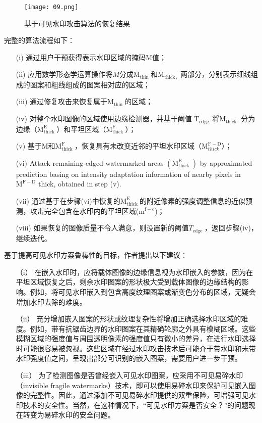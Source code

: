 \begin{figure*}[!htbp]
	\centering
	\texttt{[image: 09.png]}
	\caption{基于可见水印攻击算法的恢复结果}
	\label{fig:09}
\end{figure*}

完整的算法流程如下：

\begin{enumerate}
	\item[(i)] 通过用户干预获得表示水印区域的掩码$\mathrm{M}$值；
	\item[(ii)] 应用数学形态学运算操作将$M$分成$\mathrm{M}_{\text {thin }}$和$\mathrm{M}_{\text {thick，}}$两部分，分别表示细线组成的图案和粗线组成的图案相对应的区域；
	\item[(iii)] 通过修复攻击来恢复属于$\mathrm{M}_{\text {thin }}$的区域；
	\item[(iv)] 对整个水印图像的区域使用边缘检测器，并基于阈值  $\mathrm{T}_{\text {edge. }}$将$\mathrm{M}_{\text {thick }}$  分为边缘（$\mathrm{M}_{\text {thick }}^{\mathrm{E}}$）和平坦区域（$\mathrm{M}_{\text {thick }}^{\mathrm{F}}$）；
	\item[(v)] 基于$\mathrm{M}$和$\mathrm{M}_{\text {thick }}^{\mathrm{F}}$，恢复具有未改变近邻的平坦水印区域（$\mathrm{M}^{\mathrm{F}-\mathrm{D}}_{thick}$）；
	\item[(vi)] Attack remaining edged watermarked areas $\left(\mathrm{M}_{\text {thick }}^{\mathrm{E}}\right)$ by approximated prediction basing on intensity adaptation information of nearby pixels in $\mathrm{M}^{\mathrm{F}-\mathrm{D}}$ thick, obtained in step (v).
	\item[(vii)] 通过基于在步骤(vi)中恢复的$\mathrm{M}_{\text {thick }}^{\mathrm{E}}$的附近像素的强度调整信息的近似预测，攻击完全包含在水印内的平坦区域($\mathrm{m}^{\mathrm{f}-\mathrm{c}}$)；	
	\item[(viii)] 如果恢复的图像质量不令人满意，则设置新的阈值$T_{\text {edge }}$，返回步骤(iv)，继续迭代。

\end{enumerate}

基于提高可见水印方案鲁棒性的目标，作者提出以下建议：
\begin{enumerate}
	\item[（i）] 在嵌入水印时，应将载体图像的边缘信息视为水印嵌入的参数，因为在平坦区域恢复之后，剩余水印图案的形状极大受到载体图像的边缘结构的影响。例如，将可见水印嵌入到包含高度纹理图案或渐变色分布的区域，无疑会增加水印去除的难度。
	\item[（ii）] 充分增加嵌入图案的形状或纹理复杂性将增加正确选择水印区域的难度。例如，带有抗锯齿边界的水印图案在其精确轮廓之外具有模糊区域。这些模糊区域的强度值与周围透明像素的强度值只有微小的差异，在进行水印选择时可能很容易被忽视。这些区域在经过水印攻击技术后可能介于带水印和未带水印强度值之间，呈现出部分可识别的嵌入图案，需要用户进一步干预。
	\item[（iii）] 为了检测图像是否曾经嵌入可见水印图案，应采用不可见易碎水印（invisible fragile watermarks）技术，即可以使用易碎水印来保护可见嵌入图像的完整性。因此，通过添加不可见易碎水印提供的双重保险，可增强可见水印技术的安全性。当然，在这种情况下，“可见水印方案是否安全？”的问题现在转变为易碎水印的安全问题。
\end{enumerate}

